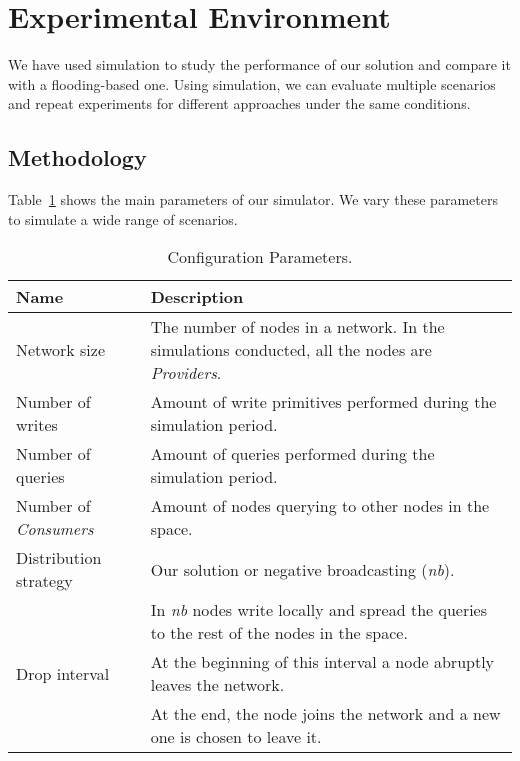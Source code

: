 \section{Experimental Environment}
\label{environment}
We have used simulation to study the performance of our solution and compare it with a flooding-based one.
Using simulation, we can evaluate multiple scenarios and repeat experiments for different approaches under the same conditions.

\subsection{Methodology}
Table~\ref{tab:configurationParameters} shows the main parameters of our simulator.
We vary these parameters to simulate a wide range of scenarios.


\begin{table}
\centering
\caption {Configuration Parameters.}
\begin{tabular}{l p{7cm}}
\hline
Name & Description \\
\hline
Network size & The number of nodes in a network. In the simulations conducted, all the nodes are \emph{Providers}. \\
Number of writes & Amount of write primitives performed during the simulation period. \\
Number of queries & Amount of queries performed during the simulation period. \\
Number of \emph{Consumers} & Amount of nodes querying to other nodes in the space. \\
Distribution strategy & Our solution or negative broadcasting (\emph{nb}). \\
& In \emph{nb} nodes write locally and spread the queries to the rest of the nodes in the space. \\
Drop interval & At the beginning of this interval a node abruptly leaves the network. \\
& At the end, the node joins the network and a new one is chosen to leave it. \\
\hline
\end{tabular}
\label{tab:configurationParameters}
\end{table}

